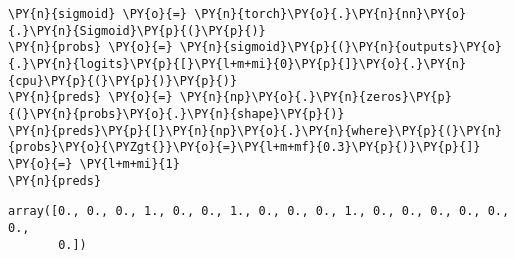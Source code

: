 \documentclass[../main.tex]{subfiles}
\begin{document}
    \begin{tcolorbox}[breakable, size=fbox, boxrule=1pt, pad at break*=1mm,colback=cellbackground, colframe=cellborder]
\begin{Verbatim}[commandchars=\\\{\}]
\PY{n}{sigmoid} \PY{o}{=} \PY{n}{torch}\PY{o}{.}\PY{n}{nn}\PY{o}{.}\PY{n}{Sigmoid}\PY{p}{(}\PY{p}{)}
\PY{n}{probs} \PY{o}{=} \PY{n}{sigmoid}\PY{p}{(}\PY{n}{outputs}\PY{o}{.}\PY{n}{logits}\PY{p}{[}\PY{l+m+mi}{0}\PY{p}{]}\PY{o}{.}\PY{n}{cpu}\PY{p}{(}\PY{p}{)}\PY{p}{)}
\PY{n}{preds} \PY{o}{=} \PY{n}{np}\PY{o}{.}\PY{n}{zeros}\PY{p}{(}\PY{n}{probs}\PY{o}{.}\PY{n}{shape}\PY{p}{)}
\PY{n}{preds}\PY{p}{[}\PY{n}{np}\PY{o}{.}\PY{n}{where}\PY{p}{(}\PY{n}{probs}\PY{o}{\PYZgt{}}\PY{o}{=}\PY{l+m+mf}{0.3}\PY{p}{)}\PY{p}{]} \PY{o}{=} \PY{l+m+mi}{1}
\PY{n}{preds}
\end{Verbatim}
\end{tcolorbox}

            \begin{tcolorbox}[breakable, size=fbox, boxrule=.5pt, pad at break*=1mm, opacityfill=0]
\begin{Verbatim}[commandchars=\\\{\}]
array([0., 0., 0., 1., 0., 0., 1., 0., 0., 0., 1., 0., 0., 0., 0., 0., 0.,
       0.])
\end{Verbatim}
\end{tcolorbox}
        
\end{document}

